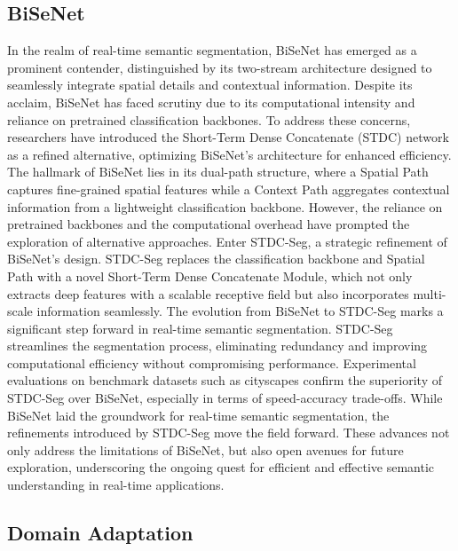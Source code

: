 \documentclass[10pt,twocolumn,letterpaper]{article}
\begin{document}
\subsection{BiSeNet}

In the realm of real-time semantic segmentation, BiSeNet has emerged as a prominent contender, distinguished by its two-stream architecture designed to seamlessly integrate spatial details and contextual information. Despite its acclaim, BiSeNet has faced scrutiny due to its computational intensity and reliance on pretrained classification backbones. To address these concerns, researchers have introduced the Short-Term Dense Concatenate (STDC) network as a refined alternative, optimizing BiSeNet's architecture for enhanced efficiency.
The hallmark of BiSeNet lies in its dual-path structure, where a Spatial Path captures fine-grained spatial features while a Context Path aggregates contextual information from a lightweight classification backbone. However, the reliance on pretrained backbones and the computational overhead have prompted the exploration of alternative approaches.\cite{BiSenet}
Enter STDC-Seg, a strategic refinement of BiSeNet's design. STDC-Seg replaces the classification backbone and Spatial Path with a novel Short-Term Dense Concatenate Module, which not only extracts deep features with a scalable receptive field but also incorporates multi-scale information seamlessly.
The evolution from BiSeNet to STDC-Seg marks a significant step forward in real-time semantic segmentation. STDC-Seg streamlines the segmentation process, eliminating redundancy and improving computational efficiency without compromising performance. Experimental evaluations on benchmark datasets such as cityscapes confirm the superiority of STDC-Seg over BiSeNet, especially in terms of speed-accuracy trade-offs.\cite{RealTimeBiSeNet}
While BiSeNet laid the groundwork for real-time semantic segmentation, the refinements introduced by STDC-Seg move the field forward. These advances not only address the limitations of BiSeNet, but also open avenues for future exploration, underscoring the ongoing quest for efficient and effective semantic understanding in real-time applications.

\subsection{Domain Adaptation}
\end{document}
